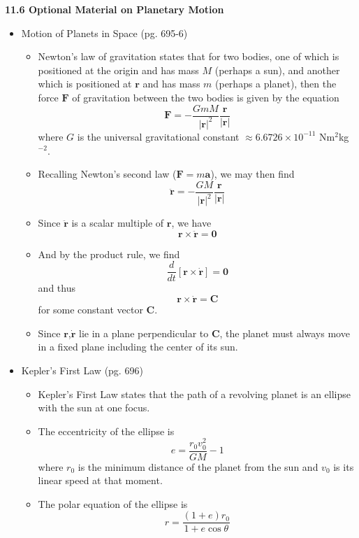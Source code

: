 \documentclass[12pt]{article}
\renewcommand{\vec}[1]{\mathbf{#1}}
\newcommand{\<}{\left<}
\renewcommand{\>}{\right>}
\begin{document}
  \newpage
  
  \centerline{\bf 11.6 Optional Material on Planetary Motion}
  
  \begin{itemize}
  \item Motion of Planets in Space (pg. 695-6)
  
    \begin{itemize}
    \item Newton's law of gravitation states that for two bodies, one of which is positioned at the origin and has mass $M$ (perhaps a sun), and another which is positioned at $\vec{r}$ and has mass $m$ (perhaps a planet), then the force $\vec{F}$ of gravitation between the two bodies is given by the equation \[\vec{F} = -\frac{GmM}{|\vec{r}|^2}\frac{\vec{r}}{|\vec{r}|}\] where $G$ is the universal gravitational constant $\approx 6.6726 \times 10^{-11}$ Nm$^2$kg$^{-2}$.
    
    \item Recalling Newton's second law ($\vec{F} = m\vec{a}$), we may then find \[\ddot{\vec{r}} = -\frac{GM}{|\vec{r}|^2}\frac{\vec{r}}{|\vec{r}|}\]
    
    \item Since $\ddot{\vec{r}}$ is a scalar multiple of $\vec{r}$, we have \[\vec{r} \times \ddot{\vec{r}} = \vec{0}\]
    
    \item And by the product rule, we find \[\frac{d}{dt}\left[\vec{r}\times\dot{\vec{r}}\right] = \vec{0}\] and thus \[\vec{r}\times\dot{\vec{r}} = \vec{C}\] for some constant vector $\vec{C}$.
    
    \item Since $\vec{r}$,$\dot{\vec{r}}$ lie in a plane perpendicular to $\vec{C}$, the planet must always move in a fixed plane including the center of its sun.
    \end{itemize}
  
  \item Kepler's First Law (pg. 696)
  
    \begin{itemize}
    \item Kepler's First Law states that the path of a revolving planet is an ellipse with the sun at one focus.
    \item The eccentricity of the ellipse is \[e = \frac{r_0v_0^2}{GM} - 1\] where $r_0$ is the minimum distance of the planet from the sun and $v_0$ is its linear speed at that moment.
    \item The polar equation of the ellipse is \[r = \frac{(1+e)r_0}{1+e\cos\theta}\]
    \end{itemize}
    

\end{itemize}
\end{document}
